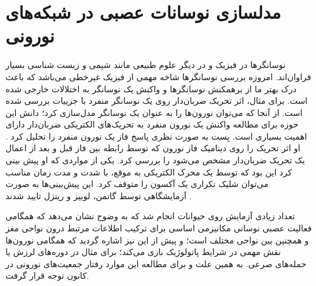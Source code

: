 \section{   مدلسازی نوسانات عصبی در شبکه‌های نورونی }

نوسانگرها در فیزیک و در دیگر علوم طبیعی  مانند شیمی و زیست شناسی بسیار فراوان‌اند.
امروزه بررسی نوسانگر‌ها شاخه مهمی از فیزیک غیرخطی می‌باشد که باعث درک بهتر ما از برهمکنش نوسانگر‌ها و واکنش یک نوسانگر به اختلالات خارجی شده است.
برای مثال، اثر تحریک ضربان‌دار
روی یک نوسانگر منفرد با جزییات بررسی شده است. 
از آنجا که می‌توان نورون‌ها را به عنوان یک نوسانگر مدل‌سازی کرد؛ دانش  این حوزه برای مطالعه واکنش یک نورون منفرد به تحریک‌های الکتریکی ضربان‌دار دارای اهمیت بسیاری است.
بِست
به صورت نظری پاسخ فاز
یک نورون منفرد را تحلیل کرد
\cite{best1979disrupting}.
او اثر تحریک را روی دینامیک فاز نورون که توسط رابطه بین فاز قبل و بعد از اعمال یک تحریک ضربان‌دار مشخص می‌شود را بررسی کرد. یکی از مواردی که او پیش بینی کرد این بود که توسط یک محرک الکتریکی به موقع، با شدت و مدت زمان مناسب می‌توان شلیک تکراری یک آکسون را متوقف کرد. این پیش‌بینی‌ها به صورت آزمایشگاهی توسط گاتمن، لوییز و رینزل تایید شدند
\cite{guttman1980control}.

تعداد زیادی آزمایش روی حیوانات انجام شد که به وضوح نشان می‌دهد که همگامی فعالیت عصبی نوسانی مکانیزمی اساسی برای ترکیب اطلاعات مرتبط درون نواحی مغز و همچنین بین نواحی مختلف است؛ و پیش از این نیز اشاره گردید که همگامی نورون‌ها نقش مهمی در شرایط پاتولوژیک بازی می‌کند؛ برای مثال در دوره‌های لرزش یا حمله‌های صرعی. به همین علت و برای مطالعه این موارد رفتار جمعیت‌های نورونی در کانون توجه قرار گرفت. 


